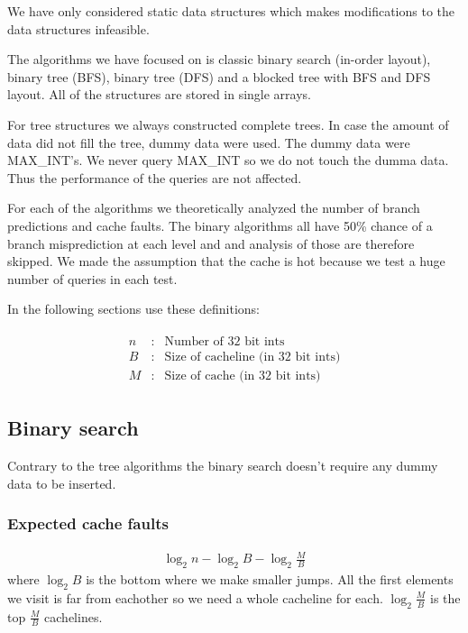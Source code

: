 We have only considered static data structures which makes modifications to the data structures infeasible.

The algorithms we have focused on is classic binary search (in-order layout), binary tree (BFS), binary tree (DFS) and a blocked tree with BFS and DFS layout. All of the structures are stored in single arrays.

For tree structures we always constructed complete trees. In case the amount of data did not fill the tree, dummy data were used. The dummy data were MAX\_INT's. We never query MAX\_INT so we do not touch the dumma data. Thus the performance of the queries are not affected.

For each of the algorithms we theoretically analyzed the number of branch predictions and cache faults. The binary algorithms all have 50\% chance of a branch misprediction at each level and and analysis of those are therefore skipped. We made the assumption that the cache is hot because we test a huge number of queries in each test.

In the following sections use these definitions:

\begin{eqnarray*}
\begin{array}{rcl}
n & : & \textrm{Number of 32 bit ints} \\
B & : & \textrm{Size of cacheline (in 32 bit ints)} \\
M & : & \textrm{Size of cache (in 32 bit ints)}
\end{array}
\end{eqnarray*}

\subsection{Binary search}

Contrary to the tree algorithms the binary search doesn't require any dummy data to be inserted.

\subsubsection*{Expected cache faults}

\begin{eqnarray*}
\log_2 n - \log_2 B - \log_2 \frac{M}{B} 
\end{eqnarray*}
where $\log_2 B$ is the bottom where we make smaller jumps. All the first elements we visit is far from eachother so we need a whole cacheline for each. $\log_2 \frac{M}{B}$ is the top $\frac{M}{B}$ cachelines.

